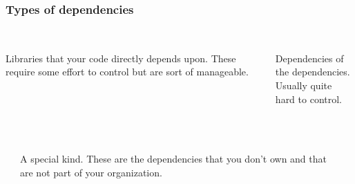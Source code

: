 \documentclass[aspectratio=169]{beamer}              %
\begin{document}
\begin{frame}
	\frametitle{Types of dependencies}
\begin{columns}
\begin{column}{0.5\textwidth}
   	\begin{center}{\color{orange}{Direct dependencies}}
   		\vspace{1mm}\\
Libraries that your code directly depends upon. These require some effort to control but are sort of manageable.
	\end{center}
     
\end{column}
\begin{column}{0.5\textwidth} 
\begin{center}{\color{orange}{Transitive dependencies}}
   		\vspace{1mm}\\
Dependencies of the dependencies.\\Usually quite hard to control.\\~
     \end{center}
\end{column}
\end{columns}

\vspace{10mm}

\begin{columns}
\begin{column}{0.25\textwidth}
\end{column}

\begin{column}{0.5\textwidth}
\begin{center}{\color{orange}{Third party dependencies}}
   		\vspace{1mm}\\
A special kind. These are the dependencies that you don't own and that are not part of your organization. 
     \end{center}
\end{column}

\begin{column}{0.25\textwidth}
\end{column}
\end{columns}

\end{frame}
\end{document}
